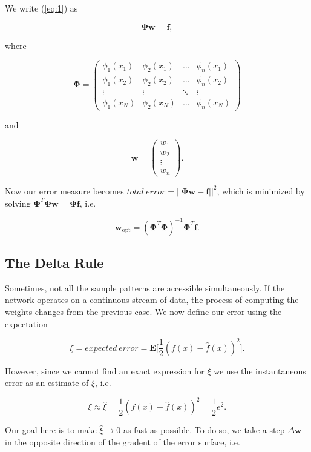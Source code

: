 \documentclass[letterpaper, 10 pt, conference]{ieeeconf}  %
\begin{document}
We write (\ref{eq:1}) as

$$
\boldsymbol{\Phi}\textbf{w} = \textbf{f},
$$

where

\begin{equation} \nonumber
\boldsymbol{\Phi} = 
\begin{pmatrix}
\phi_1(x_1) & \phi_2(x_1) & \dots & \phi_n(x_1)\\
\phi_1(x_2) & \phi_2(x_2) & \dots & \phi_n(x_2) \\
\vdots & \vdots & \ddots & \vdots \\
\phi_1(x_N) & \phi_2(x_N) & \dots & \phi_n(x_N)
\end{pmatrix}
\end{equation}

and

\begin{equation}
\textbf{w} = 
\begin{pmatrix}
w_1 \\
w_2 \\
\vdots \\
w_n
\end{pmatrix}.
\end{equation}

Now our error measure becomes $total~error = || \boldsymbol{\Phi}\textbf{w} - \textbf{f}||^2$, which is minimized by solving $ \boldsymbol{\Phi}^T \boldsymbol{\Phi}\textbf{w} = \boldsymbol{\Phi} \textbf{f}$, i.e.

$$
\textbf{w}_\text{opt} = (\boldsymbol{\Phi}^T \boldsymbol{\Phi})^{-1}\boldsymbol{\Phi}^T \textbf{f}.
$$

\subsection{The Delta Rule}
Sometimes, not all the sample patterns are accessible simultaneously.  If the network operates on a continuous stream of data,  the process of computing the weights changes from the previous case. We now define our error using the expectation

$$
\xi = expected~error= \textbf{E}\Big[ \frac{1}{2} (f(x) - \hat{f}(x))^2\Big].
$$

However, since we cannot find an exact expression for $\xi$ we use the instantaneous error as an estimate of $\xi$, i.e.

$$
\xi \approx \hat{\xi} = \frac{1}{2} (f(x) - \hat{f}(x))^2 = \frac{1}{2} e^2.
$$

Our goal here is to make $\hat{\xi} \to 0$ as fast as possible. To do so, we take a step $\Delta \textbf{w}$ in the opposite direction of the gradent of the error surface, i.e.
\end{document}
